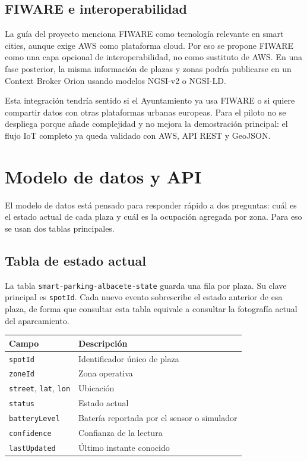 \documentclass[11pt,a4paper]{article}
\begin{document}
\subsection{FIWARE e interoperabilidad}

La guía del proyecto menciona FIWARE como tecnología relevante en smart cities, aunque exige AWS como plataforma cloud. Por eso se propone FIWARE como una capa opcional de interoperabilidad, no como sustituto de AWS. En una fase posterior, la misma información de plazas y zonas podría publicarse en un Context Broker Orion usando modelos NGSI-v2 o NGSI-LD.

Esta integración tendría sentido si el Ayuntamiento ya usa FIWARE o si quiere compartir datos con otras plataformas urbanas europeas. Para el piloto no se despliega porque añade complejidad y no mejora la demostración principal: el flujo IoT completo ya queda validado con AWS, API REST y GeoJSON.

\section{Modelo de datos y API}

El modelo de datos está pensado para responder rápido a dos preguntas: cuál es el estado actual de cada plaza y cuál es la ocupación agregada por zona. Para eso se usan dos tablas principales.

\subsection{Tabla de estado actual}

La tabla \texttt{smart-parking-albacete-state} guarda una fila por plaza. Su clave principal es \texttt{spotId}. Cada nuevo evento sobrescribe el estado anterior de esa plaza, de forma que consultar esta tabla equivale a consultar la fotografía actual del aparcamiento.

\begin{longtable}{P{4.1cm}P{10.6cm}}
\toprule
\textbf{Campo} & \textbf{Descripción} \\
\midrule
\endhead
\texttt{spotId} & Identificador único de plaza \\
\texttt{zoneId} & Zona operativa \\
\texttt{street}, \texttt{lat}, \texttt{lon} & Ubicación \\
\texttt{status} & Estado actual \\
\texttt{batteryLevel} & Batería reportada por el sensor o simulador \\
\texttt{confidence} & Confianza de la lectura \\
\texttt{lastUpdated} & Último instante conocido \\
\bottomrule
\end{longtable}
\end{document}
